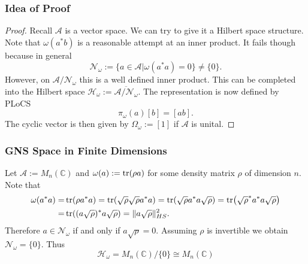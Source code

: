 \documentclass{beamer}
\begin{document}
\begin{frame}

	\frametitle{Idea of Proof}

	\begin{proof}
		Recall $\mathcal{A}$ is a vector space. We can try to give it a Hilbert space structure. Note that $\omega(a^*b)$ is a reasonable attempt at an inner product. It fails though because in general 
		\begin{equation}
			\mathcal{N}_\omega:=\{a\in\mathcal{A}|\omega(a^*a)=0\}\neq\{0\}.
		\end{equation}
However, on $\mathcal{A}/\mathcal{N}_\omega$ this is a well defined inner product. This can be completed into the Hilbert space $\mathcal{H}_\omega:=\overline{\mathcal{A}/\mathcal{N}_\omega}$. The representation is now defined by PLoCS
		\begin{equation}
			\pi_\omega(a)[b]=[ab].
		\end{equation}
The cyclic vector is then given by $\Omega_\omega:=[1]$ if $\mathcal{A}$ is unital.
	\end{proof}

\end{frame}

\begin{frame}

	\frametitle{GNS Space in Finite Dimensions}
	
	\begin{Example}
		Let $\mathcal{A}:=M_n(\mathbb{C})$ and $\omega(a):=\tr(\rho a)$ for some density matrix $\rho$ of dimension $n$. Note that
		\begin{align}
		\begin{split}
			\omega(a^*a)=&\tr(\rho a^* a)=\tr(\sqrt{\rho}\sqrt{\rho}a^*a)=\tr(\sqrt{\rho}a^*a\sqrt{\rho})=\tr(\sqrt{\rho}^*a^*a\sqrt{\rho})\\
			=&\tr((a\sqrt{\rho})^*a\sqrt{\rho})=\|a\sqrt{\rho}\|_{HS}^2.
		\end{split}
		\end{align}
Therefore $a\in\mathcal{N}_\omega$ if and only if $a\sqrt{\rho}=0$. Assuming $\rho$ is invertible we obtain $\mathcal{N}_\omega=\{0\}$. Thus 
		\begin{equation}
		\mathcal{H}_\omega=M_n(\mathbb{C})/\{0\}\cong M_n(\mathbb{C})
		\end{equation}
	\end{Example}
	
\end{frame}
\end{document}
